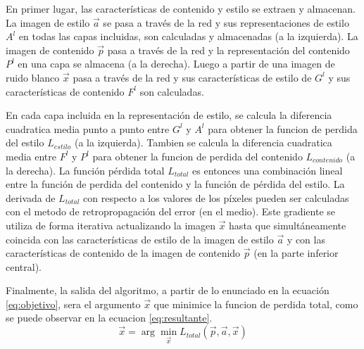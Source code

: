 \documentclass[a4paper,11pt,spanish]{book}
\begin{document}
      En primer lugar, las características de contenido y estilo se extraen y almacenan. La imagen de estilo $\overrightarrow{a}$ se pasa a través de la red
      y sus representaciones de estilo $A^l$ en todas las capas incluidas, son calculadas y almacenadas (a la izquierda). La imagen de contenido $\overrightarrow{p}$ pasa a través
      de la red y la representación del contenido $P^l$ en una capa se almacena (a la derecha). Luego a partir de una imagen de ruido blanco $\overrightarrow{x}$ pasa a través de la red y sus
      características de estilo de $G^l$ y sus características de contenido $F^l$ son calculadas.
      
      En cada capa incluida en la representación de estilo, se calcula la diferencia cuadratica media punto a punto entre $G^l$ y $A^l$ para obtener la funcion de perdida del estilo
      $L_{estilo}$ (a la izquierda). Tambien se calcula la diferencia cuadratica media entre $F^l$ y $P^l$ para obtener la funcion de perdida del contenido $L_{contenido}$ (a la derecha).
      La función pérdida total $L_{total}$ es entonces una combinación lineal entre la función de perdida del contenido y la función de pérdida del estilo.
      La derivada de  $L_{total}$ con respecto a los valores de los píxeles pueden ser calculadas con el metodo  de retropropagación del error (en el medio).
      Este gradiente se utiliza de forma iterativa actualizando la imagen $\overrightarrow{x}$ hasta que simultáneamente coincida con las características de estilo de la imagen
      de estilo $\overrightarrow{a}$ y con las características de contenido de la imagen de contenido $\overrightarrow{p}$ (en la parte inferior central).
      
      Finalmente, la salida del algoritmo, a partir de lo enunciado en la ecuación \eqref{eq:objetivo}, sera el argumento $\overrightarrow{x}$
      que minimice la funcion de perdida total, como se puede observar en la ecuacion \eqref{eq:resultante}. 
      \begin{equation} \label{eq:resultante}
       \overrightarrow{x} = \arg\min_{\overrightarrow{x}} L_{total}(\overrightarrow{p},\overrightarrow{a},\overrightarrow{x})
      \end{equation}
      
\end{document}
